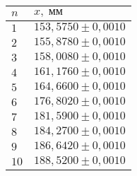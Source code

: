 \begin{tabular}{|l|l|}
\hline
$n$ & $x,\;\text{мм}$\\\hline
$1$ & $153{,}5750 \pm 0{,}0010$\\\hline
$2$ & $155{,}8780 \pm 0{,}0010$\\\hline
$3$ & $158{,}0080 \pm 0{,}0010$\\\hline
$4$ & $161{,}1760 \pm 0{,}0010$\\\hline
$5$ & $164{,}6600 \pm 0{,}0010$\\\hline
$6$ & $176{,}8020 \pm 0{,}0010$\\\hline
$7$ & $181{,}5900 \pm 0{,}0010$\\\hline
$8$ & $184{,}2700 \pm 0{,}0010$\\\hline
$9$ & $186{,}6420 \pm 0{,}0010$\\\hline
$10$ & $188{,}5200 \pm 0{,}0010$\\\hline
\end{tabular}
